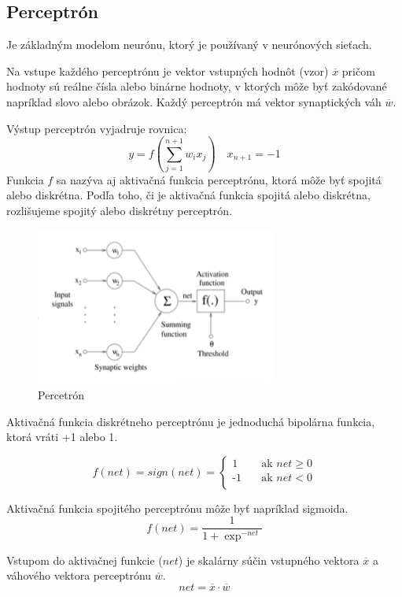 \subsection{Perceptrón}
Je základným modelom neurónu, ktorý je používaný v neurónových sieťach.

Na vstupe každého perceptrónu je vektor vstupných hodnôt (vzor) $\overline{x}$ pričom hodnoty sú reálne čísla alebo binárne hodnoty, v ktorých môže byť zakódované
napríklad slovo alebo obrázok. Každý perceptrón má vektor synaptických váh $\overline{w}$. 

Výstup perceptrón vyjadruje rovnica:
\begin{equation}
	y = f (\sum_{j=1}^{n+1} w_{i} x_{j}) \quad x_{n+1} = -1
\end{equation}
Funkcia $f$ sa nazýva aj aktivačná funkcia perceptrónu, ktorá môže byť spojitá alebo diskrétna. 
Podľa toho, či je aktivačná funkcia spojitá alebo diskrétna, rozlišujeme spojitý alebo diskrétny
perceptrón.

\begin{figure}[H]
	\centering
	\includegraphics[width=8cm]{assets/perceptron}
	\caption{Percetrón}
\end{figure}

Aktivačná funkcia diskrétneho perceptrónu je jednoduchá bipolárna funkcia, ktorá vráti +1 alebo 1.

\[
f(net) = sign(net) =
     \begin{cases}
       \text{1} &\quad\text{ak } net \geq 0 \\
       \text{-1} &\quad\text{ak } net < 0 \\
     \end{cases}
\]


Aktivačná funkcia spojitého perceptrónu môže byť napríklad sigmoida.
\begin{equation}
f(net) = \frac{1}{1 + \exp^{-net}}  
\end{equation}

Vstupom do aktivačnej funkcie ($net$) je skalárny súčin vstupného vektora $\overline{x}$ a 
váhového vektora perceptrónu $\overline{w}$.
\begin{equation}
	net = \overline{x} \cdot \overline{w}
\end{equation}

